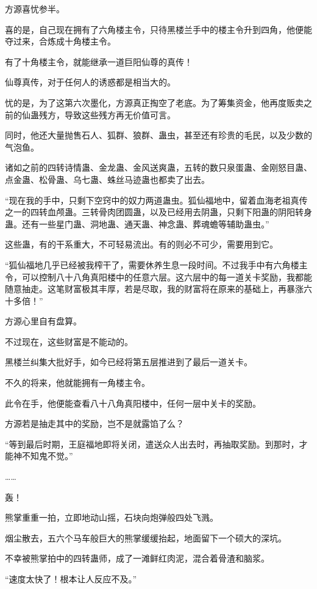\begin{this_body}
方源喜忧参半。

喜的是，自己现在拥有了六角楼主令，只待黑楼兰手中的楼主令升到四角，他便能夺过来，合炼成十角楼主令。

有了十角楼主令，就能继承一道巨阳仙尊的真传！

仙尊真传，对于任何人的诱惑都是相当大的。

忧的是，为了这第六次墨化，方源真正掏空了老底。为了筹集资金，他再度贩卖之前的仙蛊残方，导致这些残方再无价值可言。

同时，他还大量抛售石人、狐群、狼群、蛊虫，甚至还有珍贵的毛民，以及少数的气泡鱼。

诸如之前的四转诗情蛊、金龙蛊、金风送爽蛊，五转的数只泉蛋蛊、金刚怒目蛊、点金蛊、松骨蛊、乌七蛊、蛛丝马迹蛊也都卖了出去。

“现在我的手中，只剩下空窍中的奴力两道蛊虫。狐仙福地中，留着血海老祖真传之一的四转血颅蛊。三转骨肉团圆蛊，以及已经用去阴蛊，只剩下阳蛊的阴阳转身蛊。还有一些星门蛊、洞地蛊、通天蛊、神念蛊、葬魂蟾等辅助蛊虫。”

这些蛊，有的干系重大，不可轻易流出。有的则必不可少，需要用到它。

“狐仙福地几乎已经被我榨干了，需要休养生息一段时间。不过我手中有六角楼主令，可以控制八十八角真阳楼中的任意六层。这六层中的每一道关卡奖励，我都能随意抽走。这笔财富极其丰厚，若是尽取，我的财富将在原来的基础上，再暴涨六十多倍！”

方源心里自有盘算。

不过现在，这些财富是不能动的。

黑楼兰纠集大批好手，如今已经将第五层推进到了最后一道关卡。

不久的将来，他就能拥有一角楼主令。

此令在手，他便能查看八十八角真阳楼中，任何一层中关卡的奖励。

方源若是抽走其中的奖励，岂不是就露馅了么？

“等到最后时期，王庭福地即将关闭，遣送众人出去时，再抽取奖励。到那时，才能神不知鬼不觉。”

……

轰！

熊掌重重一拍，立即地动山摇，石块向炮弹般四处飞溅。

烟尘散去，五六个马车般巨大的熊掌缓缓抬起，地面留下一个硕大的深坑。

不幸被熊掌拍中的四转蛊师，成了一滩鲜红肉泥，混合着骨渣和脑浆。

“速度太快了！根本让人反应不及。”


\end{this_body}
